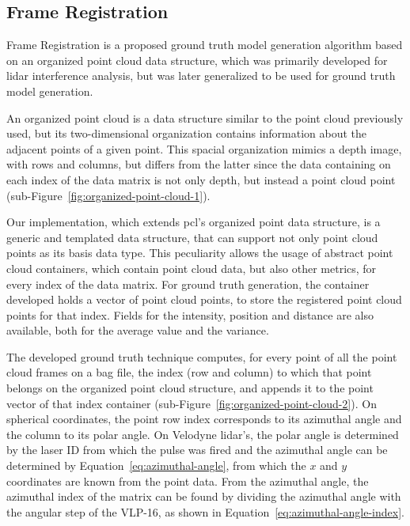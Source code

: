 \subsection{Frame Registration}
\label{subsec:lidar-interference:frame-registration}
Frame Registration is a proposed ground truth model generation algorithm based on an organized point cloud data structure, which was primarily developed for \ac{lidar} interference analysis, but was later generalized to be used for ground truth model generation.

An organized point cloud is a data structure similar to the point cloud previously used, but its two-dimensional organization contains information about the adjacent points of a given point. This spacial organization mimics a depth image, with rows and columns, but differs from the latter since the data containing on each index of the data matrix is not only depth, but instead a point cloud point (sub-Figure~\ref{fig:organized-point-cloud-1}).

Our implementation, which extends \ac{pcl}'s organized point data structure, is a generic and templated data structure, that can support not only point cloud points as its basis data type. This peculiarity allows the usage of abstract point cloud containers, which contain point cloud data, but also other metrics, for every index of the data matrix. For ground truth generation, the container developed holds a vector of point cloud points, to store the registered point cloud points for that index. Fields for the intensity, position and distance are also available, both for the average value and the variance.

The developed ground truth technique computes, for every point of all the point cloud frames on a bag file, the index (row and column) to which that point belongs on the organized point cloud structure, and appends it to the point vector of that index container (sub-Figure~\ref{fig:organized-point-cloud-2}). On spherical coordinates, the point row index corresponds to its azimuthal angle and the column to its polar angle. On Velodyne \ac{lidar}'s, the polar angle is determined by the laser ID from which the pulse was fired and the azimuthal angle can be determined by Equation~\eqref{eq:azimuthal-angle}, from which the $x$ and $y$ coordinates are known from the point data. From the azimuthal angle, the azimuthal index of the matrix can be found by dividing the azimuthal angle with the angular step of the VLP-16, as shown in Equation~\eqref{eq:azimuthal-angle-index}.


